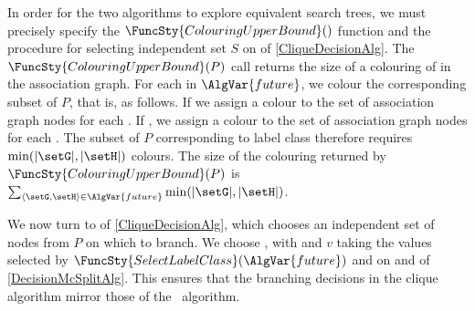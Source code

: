 In order for the two algorithms
to explore equivalent search trees, we must precisely specify
the $\FuncSty{ColouringUpperBound}()$ function and the procedure for selecting independent set $S$ on
 of \cref{CliqueDecisionAlg}.  The $\FuncSty{ColouringUpperBound}(P)$ call
returns the size of a colouring of
in the association graph.  For each
\DIFadd{$\langle \setG, \setH\rangle$}
in $\AlgVar{future}$, we colour the corresponding
subset of $P$, that is,
\DIFadd{$\setG \times \setH$,}
as follows.  If
\DIFadd{$|\setG| \leq |\setH|$,}
we assign a colour to the set
of association graph nodes
for each
.
If
\DIFadd{$|\setG| > |\setH|$}, we assign
a colour to the set of association graph nodes
for each
.
The subset of $P$ corresponding to label class
\DIFadd{$\langle \setG,\setH \rangle$}
therefore requires
$\min(|\setG|,|\setH|)$ colours.
The size of the colouring returned by $\FuncSty{ColouringUpperBound}(P)$ is
$\sum_{\langle \setG,\setH \rangle \in \AlgVar{future}} \min(|\setG|,|\setH|)$.

We now turn to  of \cref{CliqueDecisionAlg}, which chooses an independent
set of nodes from $P$ on which to branch.  We choose
, with
\DIFadd{$\setH$}
and $v$ taking the values selected by $\FuncSty{SelectLabelClass}(\AlgVar{future})$
and
on   and 
of \cref{DecisionMcSplitAlg}.  This ensures that the branching decisions in the clique algorithm
mirror those of the \McSplit\ algorithm.

